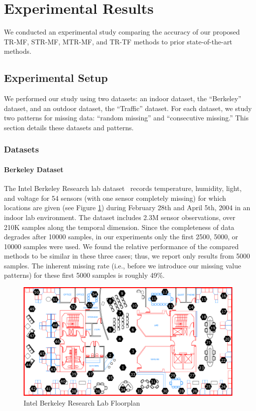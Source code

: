 \section{Experimental Results}  \label{sec:exp}

We conducted an experimental study comparing the accuracy of our proposed TR-MF, STR-MF, MTR-MF, and TR-TF methods to
prior state-of-the-art methods.

\subsection{Experimental Setup}
We performed our study using two datasets: an indoor dataset, the ``Berkeley'' dataset, and an outdoor dataset, the ``Traffic''
dataset.  For each dataset, we study two patterns for missing data: ``random missing'' and ``consecutive missing.''  This section
details these datasets and patterns.

\subsubsection{Datasets}

\paragraph*{Berkeley Dataset}

The Intel Berkeley Research lab dataset~\cite{berkeley2004lab} records temperature, humidity, light, and voltage for 54 sensors (with one sensor completely missing) for which locations are given (see Figure \ref{berkeley_lab}) during February 28th and April 5th, 2004 in an indoor lab environment.
The dataset includes 2.3M sensor observations, over 210K samples along the temporal dimension.
Since the completeness of data degrades after 10000 samples, in our experiments only the first 2500, 5000, or 10000 samples were used.
We found the relative performance of the compared methods to be similar in these three cases; thus, we report only results from 
5000 samples.  The inherent missing rate (i.e., before we introduce our missing value patterns) for these first 5000 samples is roughly 49\%.

\begin{figure}[H]
\centering
\includegraphics[scale=0.15]{berkeley_lab.png}
\caption{Intel Berkeley Research Lab Floorplan} \label{berkeley_lab}
\end{figure}

